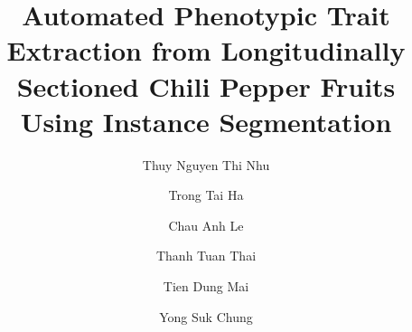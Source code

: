 \documentclass[final,5p,times,twocolumn]{elsarticle}
\begin{document}
\begin{frontmatter}

\title{Automated Phenotypic Trait Extraction from Longitudinally Sectioned Chili Pepper Fruits Using Instance Segmentation}

\author[1,2]{Thuy Nguyen Thi Nhu}

\author[1,2]{Trong Tai Ha}

\author[1,2]{Chau Anh Le}

\author[1,2,3]{Thanh Tuan Thai}

\author[1,2]{Tien Dung Mai}

\author[3]{Yong Suk Chung}

\address[1]{Faculty of Computer Science, University of Information Technology, Ho Chi Minh city 70000, Vietnam}
\address[2]{Vietnam National University, Ho Chi Minh city 70000, Vietnam}
\address[3]{Department of Plant Resources and Environment, Jeju National University, Jeju 63243, Republic of Korea}


\end{frontmatter}
\end{document}
